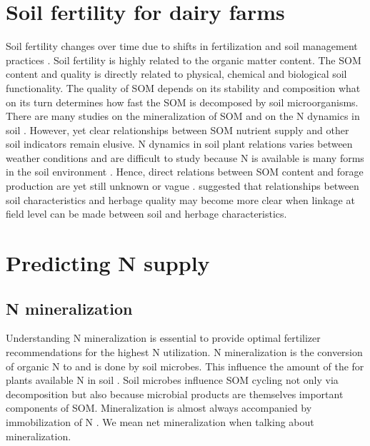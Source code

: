 \documentclass[10pt,twoside,dutch,english]{report}
\begin{document}
\section{Soil fertility for dairy farms} 
Soil fertility changes over time due to shifts in fertilization and soil management practices \citep{Hanegraaf2009}. Soil fertility is highly related to the organic matter content. The SOM content and quality is directly related to physical, chemical and biological soil functionality. The quality of SOM depends on its stability and composition what on its turn determines how fast the SOM is decomposed by soil microorganisms. There are many studies on the mineralization of SOM and on the N dynamics in soil \citep{Wander2004, Haynes2005,Ros2011}. However, yet clear relationships between SOM nutrient supply and other soil indicators remain elusive. N dynamics in soil plant relations varies between weather conditions and are difficult to study because N is available is many forms in the soil environment \citep{Nannipieri2009}. Hence, direct relations between SOM content and forage production are yet still unknown or vague \citep{Hanegraaf2009}. \citet{Reijneveld2014} suggested that relationships between soil characteristics and herbage quality may become more clear when linkage at field level can be made between soil and herbage characteristics. 

\section{Predicting N supply }
\subsection{N mineralization}
Understanding N mineralization is essential to provide optimal fertilizer recommendations for the highest N utilization. N mineralization is the conversion of organic N to  and is done by soil microbes.  This influence the amount of the for plants available N in soil \citep{Myrold2008, Geisseler2010}. Soil microbes influence SOM cycling not only via decomposition but also because microbial products are themselves important components of SOM. Mineralization is almost always accompanied by immobilization of N \citep{Powlson1993}. We mean net mineralization when talking about mineralization. 
\end{document}
